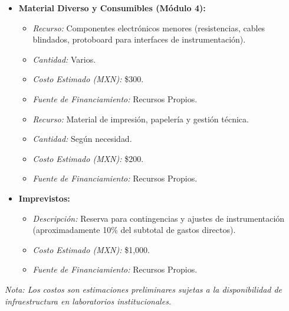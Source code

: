 \documentclass[12pt]{article}
\begin{document}
\begin{itemize}
\begin{itemize}
            \item \textit{Recurso:} Computadora personal para desarrollo y cómputo numérico (existente).
            \item \textit{Cantidad:} 1.
            \item \textit{Costo Estimado (MXN):} N/A (equipo existente).
            \item \textit{Fuente de Financiamiento:} N/A.
            \item \textit{Recurso:} Software de desarrollo (Ubuntu 24.04 LTS, ROS 2 Jazzy, Gazebo Harmonic, PyTorch 2.x, ONNX Runtime C++, AMD-Xilinx Vivado).
            \item \textit{Cantidad:} Licencias de código abierto o licencias académicas institucionales.
            \item \textit{Costo Estimado (MXN):} N/A (software de acceso abierto y licencias académicas).
            \item \textit{Fuente de Financiamiento:} N/A.
        \end{itemize}
    \item \textbf{Material Diverso y Consumibles (Módulo 4):}
        \begin{itemize}
            \item \textit{Recurso:} Componentes electrónicos menores (resistencias, cables blindados, protoboard para interfaces de instrumentación).
            \item \textit{Cantidad:} Varios.
            \item \textit{Costo Estimado (MXN):} \$300.
            \item \textit{Fuente de Financiamiento:} Recursos Propios.
            \item \textit{Recurso:} Material de impresión, papelería y gestión técnica.
            \item \textit{Cantidad:} Según necesidad.
            \item \textit{Costo Estimado (MXN):} \$200.
            \item \textit{Fuente de Financiamiento:} Recursos Propios.
        \end{itemize}
    \item \textbf{Imprevistos:}
        \begin{itemize}
            \item \textit{Descripción:} Reserva para contingencias y ajustes de instrumentación (aproximadamente 10\% del subtotal de gastos directos).
            \item \textit{Costo Estimado (MXN):} \$1,000.
            \item \textit{Fuente de Financiamiento:} Recursos Propios.
        \end{itemize}
\end{itemize}
\textit{Nota: Los costos son estimaciones preliminares sujetas a la disponibilidad de infraestructura en laboratorios institucionales.}
\end{document}
